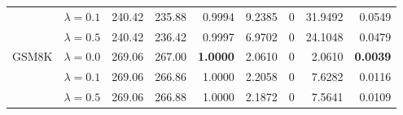 \begin{table}[t]
{\begin{tabular}{l l rrrrrrr}
 & $\lambda{=}0.1$ & 240.42 & 235.88 & 0.9994 & 9.2385 & \cellcolor{cyan!12} $0$ & 31.9492 & 0.0549 \\
 & $\lambda{=}0.5$ & 240.42 & 236.42 & 0.9997 & 6.9702 & \cellcolor{cyan!12} $0$ & 24.1048 & 0.0479 \\
\midrule
GSM8K & $\lambda{=}0.0$ & 269.06 & 267.00 & \textbf{1.0000} & 2.0610 & \cellcolor{cyan!12} $0$ & 2.0610 & \textbf{0.0039} \\
 & $\lambda{=}0.1$ & 269.06 & 266.86 & 1.0000 & 2.2058 & \cellcolor{cyan!12} $0$ & 7.6282 & 0.0116 \\
 & $\lambda{=}0.5$ & 269.06 & 266.88 & 1.0000 & 2.1872 & \cellcolor{cyan!12} $0$ & 7.5641 & 0.0109 \\
\bottomrule
\end{tabular}}
\end{table}